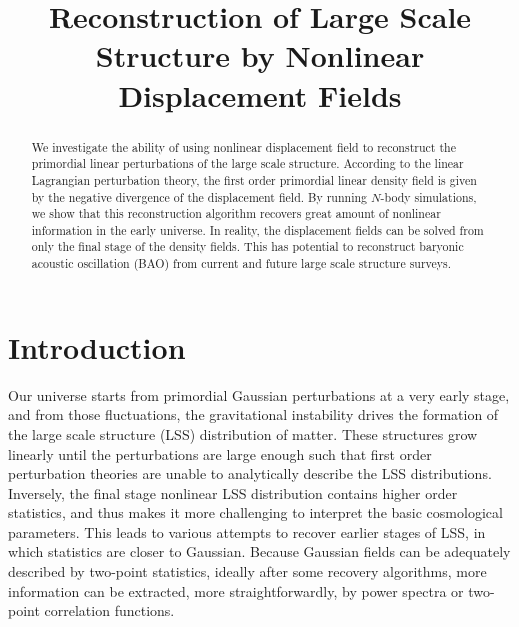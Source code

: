 \documentclass[aps,prd,twocolumn,superscriptaddress,amsfont,amssymb,amsmath,nofootinbib,showpacs,balancelastpage]{revtex4-1}
\begin{document}
\addtolength{\hoffset}{-0.525cm}
\addtolength{\textwidth}{1.05cm}
\title{Reconstruction of Large Scale Structure by Nonlinear Displacement Fields}




\begin{abstract}
We investigate the ability of using nonlinear displacement field to reconstruct the primordial linear perturbations of the large scale structure. According to the linear Lagrangian perturbation theory, the first order primordial linear density field is given by the negative divergence of the displacement field. By running $N$-body simulations, we show that this reconstruction algorithm recovers great amount of nonlinear information in the early universe. In reality, the displacement fields can be solved from only the final stage of the density fields. This has potential to reconstruct baryonic acoustic oscillation (BAO) from current and future large scale structure surveys.
\end{abstract}


\maketitle

\section{Introduction}\label{sec.intro}
Our universe starts from primordial Gaussian perturbations at a very early stage, and from those fluctuations, the gravitational instability drives the formation of the large scale structure (LSS) distribution of matter. These structures grow linearly until the perturbations are large enough such that first order perturbation theories are unable to analytically describe the LSS distributions. Inversely, the final stage nonlinear LSS distribution contains higher order statistics, and thus makes it more challenging to interpret the basic cosmological parameters. This leads to various attempts to recover earlier stages of LSS, in which statistics are closer to Gaussian. Because Gaussian fields can be adequately described by two-point statistics, ideally after some recovery algorithms, more information can be extracted, more straightforwardly, by power spectra or two-point correlation functions.
\end{document}
